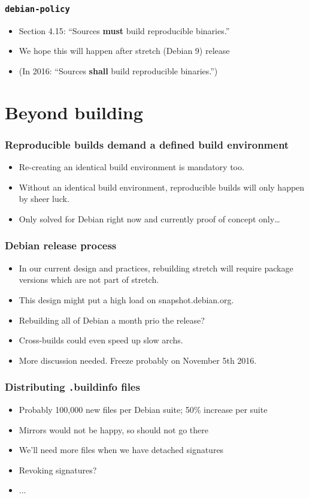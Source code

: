 \documentclass[14pt,aspectratio=169]{beamer}
\begin{document}
\begin{frame}
 \frametitle{\texttt{debian-policy}}

 \begin{itemize}
  \item Section 4.15: “Sources \textbf{must} build reproducible binaries.”
  \item<2-3> We hope this will happen after stretch (Debian 9) release
  \item<3> (In 2016: “Sources \textbf{shall} build reproducible binaries.”)
 \end{itemize}
\end{frame}

\section{Beyond building}

\begin{frame}
 \frametitle{Reproducible builds demand a defined build environment}
 \begin{itemize}
  \item Re-creating an identical build environment is mandatory too.
  \item Without an identical build environment, reproducible builds will only
  happen by sheer luck.
  \item<2>{Only solved for Debian right now and currently proof of concept only…}
 \end{itemize}
\end{frame}

\begin{frame}
 \frametitle{Debian release process}
 \begin{itemize}
  \item In our current design and practices, rebuilding stretch will require
  package versions which are not part of stretch.
  \item This design might put a high load on snapshot.debian.org.
  \item<2-4>{Rebuilding all of Debian a month prio the release? }
  \item<3-4>{Cross-builds could even speed up slow archs.}
  \item<4>{More discussion needed. Freeze probably on November 5th 2016.}
 \end{itemize}
\end{frame}

\begin{frame}
 \frametitle{Distributing \texttt .buildinfo files}
 \begin{itemize}
  \item Probably 100,000 new files per Debian suite; 50\% increase per suite
  \item Mirrors would not be happy, so should not go there
  \item We'll need more files when we have detached signatures
  \item<2-3>{Revoking signatures?}
  \item<3>{...}
 \end{itemize}
\end{frame}
\end{document}
